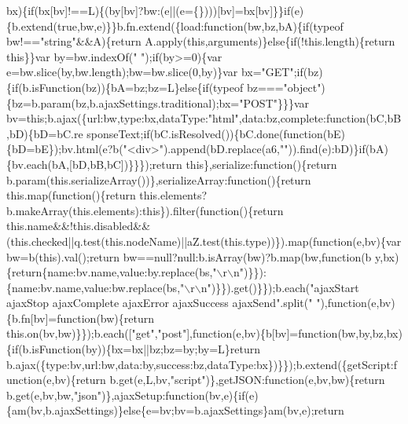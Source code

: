 \begin{DoxyCode}
{       bx)\{if(bx[bv]!==L)\{(by[bv]?bw:(e||(e=\{\})))[bv]=bx[bv]\}\}if(e)\{b.extend(true,bw,e)\}\}b.fn.extend(\{load:function(bw,bz,bA)\{if(typeof bw!=="string"&&A)\{return
       A.apply(this,arguments)\}else\{if(!this.length)\{return this\}\}var by=bw.indexOf(" ");if(by>=0)\{var e=bw.slice(by,bw.length);bw=bw.slice(0,by)\}var
       bx="GET";if(bz)\{if(b.isFunction(bz))\{bA=bz;bz=L\}else\{if(typeof
       bz==="object")\{bz=b.param(bz,b.ajaxSettings.traditional);bx="POST"\}\}\}var
       bv=this;b.ajax(\{url:bw,type:bx,dataType:"html",data:bz,complete:function(bC,bB,bD)\{bD=bC.re
      sponseText;if(bC.isResolved())\{bC.done(function(bE)\{bD=bE\});bv.html(e?b("<div>").append(bD.replace(a6,"")).find(e):bD)\}if(bA)\{bv.each(bA,[bD,bB,bC])\}\}\});return this\},serialize:function()\{return
       b.param(this.serializeArray())\},serializeArray:function()\{return this.map(function()\{return
       this.elements?b.makeArray(this.elements):this\}).filter(function()\{return
       this.name&&!this.disabled&&(this.checked||q.test(this.nodeName)||aZ.test(this.type))\}).map(function(e,bv)\{var bw=b(this).val();return
       bw==null?null:b.isArray(bw)?b.map(bw,function(b
      y,bx)\{return\{name:bv.name,value:by.replace(bs,"\(\backslash\)r\(\backslash\)n")\}\}):\{name:bv.name,value:bw.replace(bs,"\(\backslash\)r\(\backslash\)n")\}\}).get()\}\});b.each("ajaxStart ajaxStop ajaxComplete ajaxError ajaxSuccess ajaxSend".split("
       "),function(e,bv)\{b.fn[bv]=function(bw)\{return
       this.on(bv,bw)\}\});b.each(["get","post"],function(e,bv)\{b[bv]=function(bw,by,bz,bx)\{if(b.isFunction(by))\{bx=bx||bz;bz=by;by=L\}return
       b.ajax(\{type:bv,url:bw,data:by,success:bz,dataType:bx\})\}\});b.extend(\{getScript:function(e,bv)\{return b.get(e,L,bv,"script")\},getJSON:function(e,bv,bw)\{return
       b.get(e,bv,bw,"json")\},ajaxSetup:function(bv,e)\{if(e)\{am(bv,b.ajaxSettings)\}else\{e=bv;bv=b.ajaxSettings\}am(bv,e);return
       
}
\end{DoxyCode}
